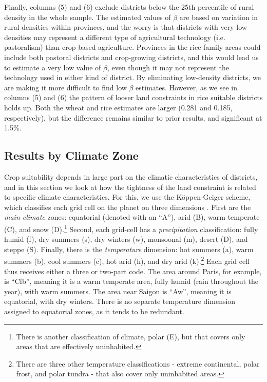 \documentclass[11pt]{article}
\begin{document}
Finally, columns (5) and (6) exclude districts below the 25th percentile of rural density in the whole sample. The estimated values of $\beta$ are based on variation in rural densities within provinces, and the worry is that districts with very low densities may represent a different type of agricultural technology (i.e. pastoralism) than crop-based agriculture. Provinces in the rice family areas could include both pastoral districts and crop-growing districts, and this would lead us to estimate a very low value of $\beta$, even though it may not represent the technology used in either kind of district. By eliminating low-density districts, we are making it more difficult to find low $\beta$ estimates. However, as we see in columns (5) and (6) the pattern of looser land constraints in rice suitable districts holds up. Both the wheat and rice estimates are larger (0.281 and 0.185, respectively), but the difference remains similar to prior results, and significant at 1.5\%.

\subsection{Results by Climate Zone}
Crop suitability depends in large part on the climatic characteristics of districts, and in this section we look at how the tightness of the land constraint is related to specific climate characteristics. For this, we use the K{\"o}ppen-Geiger scheme, which classifies each grid cell on the planet on three dimensions \citep{kottek2006}. First are the \textit{main climate} zones: equatorial (denoted with an ``A''), arid (B), warm temperate (C), and snow (D).\footnote{There is another classification of climate, polar (E), but that covers only areas that are effectively uninhabited.} Second, each grid-cell has a \textit{precipitation} classification: fully humid (f), dry summers (s), dry winters (w), monsoonal (m), desert (D), and steppe (S). Finally, there is the \textit{temperature} dimension: hot summers (a), warm summers (b), cool summers (c), hot arid (h), and dry arid (k).\footnote{There are three other temperature classifications - extreme continental, polar frost, and polar tundra - that also cover only uninhabited areas.} Each grid cell thus receives either a three or two-part code. The area around Paris, for example, is ``Cfb'', meaning it is a warm temperate area, fully humid (rain throughout the year), with warm summers. The area near Saigon is ``Aw'', meaning it is equatorial, with dry winters. There is no separate temperature dimension assigned to equatorial zones, as it tends to be redundant.
\end{document}
